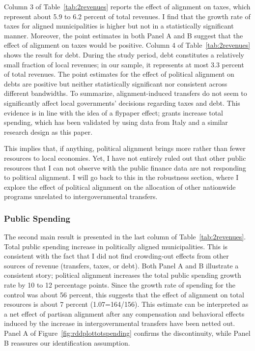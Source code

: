 \documentclass[dv_diss_main.tex]{subfiles}
\begin{document}
Column 3 of Table~\ref{tab:2revenues} reports the effect of alignment on taxes, which represent about 5.9 to 6.2 percent of total revenues. I find that the growth rate of taxes for aligned municipalities is higher but not in a statistically significant manner. Moreover, the point estimates in both Panel A and B suggest that the effect of alignment on taxes would be positive.  Column 4 of Table~\ref{tab:2revenues} shows the result for debt. During the study period, debt constitutes a relatively small fraction of local revenues; in our sample, it represents at most 3.3 percent of total revenues. The point estimates for the effect of political alignment on debts are positive but neither statistically significant nor consistent across different bandwidths.
To summarize, alignment-induced transfers do not seem to significantly affect local governments' decisions regarding taxes and debt. This evidence is in line with the idea of a flypaper effect; grants increase total spending, which has been validated by \cite{bracco2015intergovernmental} using data from Italy and a similar research design as this paper. 

This implies that, if anything, political alignment brings more rather than fewer resources to local economies. Yet, I have not entirely ruled out that other public resources that I can not observe with the public finance data are not responding to political alignment. I will go back to this in the robustness section, where I explore the effect of political alignment on the allocation of other nationwide programs unrelated to intergovernmental transfers. 

\subsubsection{Public Spending}

The second main result is presented in the last column of Table~\ref{tab:2revenues}. Total public spending increase in politically aligned municipalities. This is consistent with the fact that I did not find crowding-out effects from other sources of revenue  (transfers, taxes, or debt). Both Panel A and B illustrate a consistent story; political alignment increases the total public spending growth rate by 10 to 12 percentage points. Since the growth rate of spending for the control was about 56 percent, this suggests that the effect of alignment on total resources is about 7 percent (1.07=164/156). This estimate can be interpreted as a net effect of partisan alignment after any compensation and behavioral effects induced by the increase in intergovernmental transfers have been netted out. Panel A of Figure~\ref{fig:rddplottotspending} confirms the discontinuity, while Panel B reassures our identification assumption. 
\end{document}
